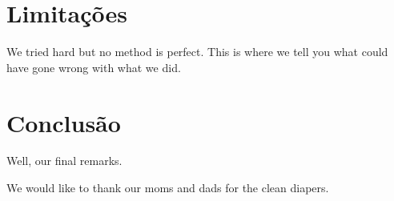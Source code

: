\documentclass[sigconf]{acmart}
\begin{document}
\section{Limitações}

We tried hard but no method is perfect. This is where we tell you what could have gone wrong with what we did.














\section{Conclusão}


Well, our final remarks.


\begin{acks}
We would like to thank our moms and dads for the clean diapers.
\end{acks}



\end{document}
